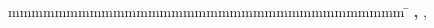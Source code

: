 \begin{titlepage}
  {}
  \enlargethispage{20mm}
  \begin{center}
    \vspace*{48mm}	{\LARGE\textbf \@title}\\
    \vspace*{12mm}	\langby\\
    \vspace*{3mm}		{\large\textbf \@author}\\
    \vspace*{12mm}	\@date\\
  \end{center}
  \vfill
  \begin{spacing}{1.2}
    \begin{tabbing}
      mmmmmmmmmmmmmmmmmmmmmmmmmmmmmmmmmm \=  \kill
      \textbf{\langmatricno, \langcourse} \>  \matricno, \course\\
    \end{tabbing}
  \end{spacing}
\end{titlepage}
